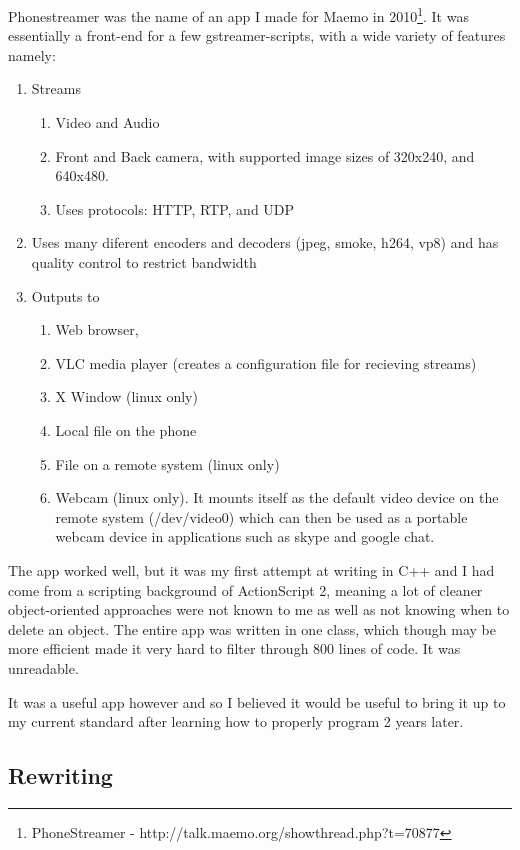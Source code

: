 Phonestreamer was the name of an app I made for Maemo in 2010\footnote{PhoneStreamer - http://talk.maemo.org/showthread.php?t=70877}. It was essentially a front-end for a few gstreamer-scripts, with a wide variety of features namely:
\begin{enumerate}
\item Streams
	\begin{enumerate}
	\item Video and Audio
	\item Front and Back camera, with supported image sizes of 320x240, and 640x480.
	\item Uses protocols: HTTP, RTP, and UDP
	\end{enumerate}
\item Uses many diferent encoders and decoders (jpeg, smoke, h264, vp8)  and has quality control to restrict bandwidth
\item Outputs to
	\begin{enumerate}
	\item Web browser,
	\item VLC media player (creates a configuration file for recieving streams)
	\item X Window (linux only)
	\item Local file on the phone
	\item File on a remote system (linux only)
	\item Webcam (linux only). It mounts itself as the default video device on the remote system (/dev/video0) which can then be used as a portable webcam device in applications such as skype and google chat.
	\end{enumerate}
\end{enumerate}

The app worked well, but it was my first attempt at writing in C++ and I had come from a scripting background of ActionScript 2, meaning a lot of cleaner object-oriented approaches were not known to me as well as not knowing when to delete an object. The entire app was written in one class, which though may be more efficient made it very hard to filter through 800 lines of code. It was unreadable.

It was a useful app however and so I believed it would be useful to bring it up to my current standard after learning how to properly program 2 years later.

\subsection{Rewriting}


